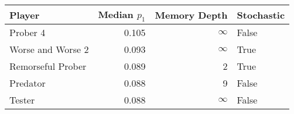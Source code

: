 \begin{tabular}{lrrl}
\toprule
            Player &  Median $p_1$ &  Memory Depth & Stochastic \\
\midrule
          Prober 4 &         0.105 &            \(\infty\) &      False \\
 Worse and Worse 2 &         0.093 &            \(\infty\) &       True \\
 Remorseful Prober &         0.089 &             2 &       True \\
          Predator &         0.088 &             9 &      False \\
            Tester &         0.088 &            \(\infty\) &      False \\
\bottomrule
\end{tabular}
